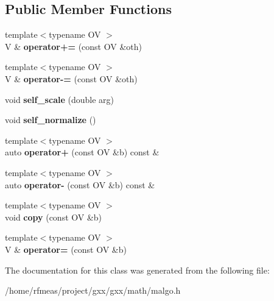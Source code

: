 \subsection*{Public Member Functions}
\begin{DoxyCompactItemize}
\item 
{\footnotesize template$<$typename OV $>$ }\\V \& {\bfseries operator+=} (const OV \&oth)\hypertarget{classmalgo_1_1vector__basic_a171b41889495af1bcbddd395c1ab8afa}{}\label{classmalgo_1_1vector__basic_a171b41889495af1bcbddd395c1ab8afa}

\item 
{\footnotesize template$<$typename OV $>$ }\\V \& {\bfseries operator-\/=} (const OV \&oth)\hypertarget{classmalgo_1_1vector__basic_a9365d8dbf0f7e0f13e291703dac41d26}{}\label{classmalgo_1_1vector__basic_a9365d8dbf0f7e0f13e291703dac41d26}

\item 
void {\bfseries self\+\_\+scale} (double arg)\hypertarget{classmalgo_1_1vector__basic_a9a325533b9c8fe90fbe03ba19d659069}{}\label{classmalgo_1_1vector__basic_a9a325533b9c8fe90fbe03ba19d659069}

\item 
void {\bfseries self\+\_\+normalize} ()\hypertarget{classmalgo_1_1vector__basic_a38c8df1e67b191acb82f5645596eb843}{}\label{classmalgo_1_1vector__basic_a38c8df1e67b191acb82f5645596eb843}

\item 
{\footnotesize template$<$typename OV $>$ }\\auto {\bfseries operator+} (const OV \&b) const \&\hypertarget{classmalgo_1_1vector__basic_a608533646455ede10fa2676dd965131d}{}\label{classmalgo_1_1vector__basic_a608533646455ede10fa2676dd965131d}

\item 
{\footnotesize template$<$typename OV $>$ }\\auto {\bfseries operator-\/} (const OV \&b) const \&\hypertarget{classmalgo_1_1vector__basic_ac7ff1898dd638581af79b4310b31d82f}{}\label{classmalgo_1_1vector__basic_ac7ff1898dd638581af79b4310b31d82f}

\item 
{\footnotesize template$<$typename OV $>$ }\\void {\bfseries copy} (const OV \&b)\hypertarget{classmalgo_1_1vector__basic_a055a33ab3a398a817f618705724bb22e}{}\label{classmalgo_1_1vector__basic_a055a33ab3a398a817f618705724bb22e}

\item 
{\footnotesize template$<$typename OV $>$ }\\V \& {\bfseries operator=} (const OV \&b)\hypertarget{classmalgo_1_1vector__basic_a665c82dacbc5d4ae760e9ff97e66301b}{}\label{classmalgo_1_1vector__basic_a665c82dacbc5d4ae760e9ff97e66301b}

\end{DoxyCompactItemize}


The documentation for this class was generated from the following file\+:\begin{DoxyCompactItemize}
\item 
/home/rfmeas/project/gxx/gxx/math/malgo.\+h\end{DoxyCompactItemize}
